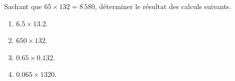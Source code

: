\begin{exercice*}
   Sachant que $65\times132 =8\,580$, déterminer le résultat des calculs suivants.
   \begin{multicols}{2}
      \begin{enumerate}
         \item $\num{6.5}\times\num{13.2}$.
         \item $650\times132$.
         \item $\num{0.65}\times\num{0.132}$.
         \item $\num{0.065}\times\num{1 320}$.
      \end{enumerate}
   \end{multicols}
\end{exercice*}
 